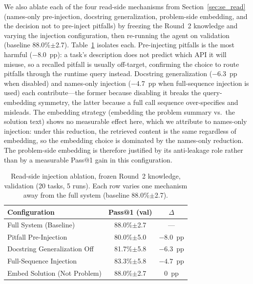 We also ablate each of the four read-side mechanisms from Section~\ref{sec:se_read} (names-only pre-injection, docstring generalization, problem-side embedding, and the decision not to pre-inject pitfalls) by freezing the Round~2 knowledge and varying the injection configuration, then re-running the agent on validation (baseline 88.0\%$\pm$2.7). Table~\ref{tab:se_read_ablation} isolates each. Pre-injecting pitfalls is the most harmful ($-$8.0~pp): a task's description does not predict which API it will misuse, so a recalled pitfall is usually off-target, confirming the choice to route pitfalls through the runtime query instead. Docstring generalization ($-$6.3~pp when disabled) and names-only injection ($-$4.7~pp when full-sequence injection is used) each contribute—the former because disabling it breaks the query-embedding symmetry, the latter because a full call sequence over-specifies and misleads. The embedding strategy (embedding the problem summary vs.\ the solution text) shows no measurable effect here, which we attribute to names-only injection: under this reduction, the retrieved content is the same regardless of embedding, so the embedding choice is dominated by the names-only reduction. The problem-side embedding is therefore justified by its anti-leakage role rather than by a measurable Pass@1 gain in this configuration.

\begin{table}[ht]
\caption{Read-side injection ablation, frozen Round~2 knowledge, validation (20 tasks, 5 runs). Each row varies one mechanism away from the full system (baseline 88.0\%$\pm$2.7).}
\label{tab:se_read_ablation}
\centering
\small
\begin{tabular}{lcc}
\toprule
Configuration & Pass@1 (val) & $\Delta$ \\
\midrule
Full System (Baseline)        & 88.0\%$\pm$2.7 & --- \\
Pitfall Pre-Injection         & 80.0\%$\pm$5.0 & $-8.0$~pp \\
Docstring Generalization Off  & 81.7\%$\pm$5.8 & $-6.3$~pp \\
Full-Sequence Injection       & 83.3\%$\pm$5.8 & $-4.7$~pp \\
Embed Solution (Not Problem)  & 88.0\%$\pm$2.7 & $0$~pp \\
\bottomrule
\end{tabular}
\end{table}
